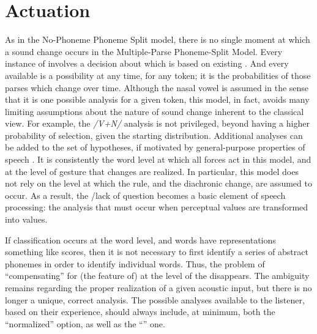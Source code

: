 \section{Actuation}

As in the No-Phoneme Phoneme Split model, there is no single moment
at which a sound change occurs in the Multiple-Parse Phoneme-Split
Model. Every instance of  involves a decision about 
which is based on existing . And every available
 is a possibility at any time, for any token; it is the probabilities
of those parses which change over time. Although the nasal vowel 
is assumed in the sense that it is one possible analysis for a given
token, this model, in fact, avoids many limiting assumptions about
the nature of sound change inherent to the classical view. For example,
the \emph{/V+N/} analysis is not privileged, beyond having a higher
probability of selection, given the starting distribution. Additional
analyses can be added to the set of  hypotheses, if motivated
by general-purpose properties of speech . It is consistently
the word level at which all forces act in this model, and at the level
of  gesture that changes are realized. In particular,
this model does not rely on the  level at which the 
rule, and the diachronic change, are assumed to occur. As a result,
the /lack of  question becomes a basic element
of speech processing: the analysis that must occur when perceptual
values are transformed into  values. 

If classification occurs at the word level, and words have 
representations something like  scores, then it is not necessary
to first identify a series of abstract phonemes in order to identify
individual words. Thus, the problem of “compensating” for (the
feature of)  at the level of the  disappears. The
ambiguity remains regarding the proper  realization of
a given acoustic input, but there is no longer a unique, correct 
analysis. The possible analyses available to the listener, based on
their  experience, should always include, at minimum, both
the “normalized” option, as well as the “”
one.

